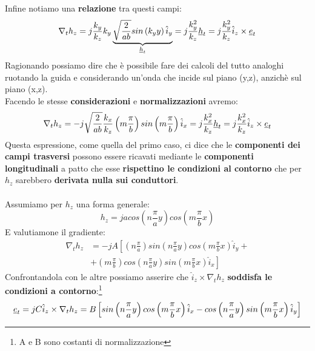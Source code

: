 Infine notiamo una \textbf{relazione} tra questi campi:
\begin{equation*}
    \nabla_t h_z = j \frac{k_y}{k_z} k_y \underbrace{\sqrt{\frac{2}{ab}}  sin\left(k_y y\right) \hat{i}_y}_{\underline{h}_t} = j \frac{k^2_y}{k_z}\underline{h}_t = j  \frac{k^2_y}{k_z} \hat{i}_z \times \underline{e}_t
\end{equation*}
Ragionando possiamo dire che è possibile fare dei calcoli del tutto analoghi ruotando la guida e considerando un'onda che incide sul piano (y,z), anzichè sul piano (x,z).\\ 
Facendo le stesse \textbf{considerazioni} e \textbf{normalizzazioni} avremo:
\begin{equation*}
    \nabla_t h_z = - j \sqrt{\frac{2}{ab}} \frac{k_x}{k_z} \left(m \frac{\pi}{b}\right) sin\left(m \frac{\pi}{b}\right)\hat{i}_x = j  \frac{k^2_x}{k_z} \underline{h}_t = j \frac{k^2_x}{k_z} \hat{i}_z \times \underline{e}_t
\end{equation*}
Questa espressione, come quella del primo caso, ci dice che le \textbf{componenti dei campi trasversi} possono essere ricavati mediante le \textbf{componenti longitudinali} a patto che esse \textbf{rispettino le condizioni al contorno} che per $h_z$ sarebbero \textbf{derivata nulla sui conduttori}.\\ \\
Assumiamo per $h_z$ una forma generale:
\begin{equation*}
    h_z = j acos\left(n \frac{\pi}{a} y\right) cos\left(m \frac{\pi}{b} x\right)
\end{equation*}E valutiamone il gradiente:
\begin{equation*}
\begin{aligned}
    \nabla_t h_z &= -j A \left[\left(n \frac{\pi}{a}\right) sin \left(n \frac{\pi}{a} y\right) cos\left(m \frac{\pi}{b} x\right)\hat{i}_y + \right. \\
    &\left. + \left(m \frac{\pi}{b} \right) cos\left(n \frac{\pi}{a} y\right) sin\left(m \frac{\pi}{b} x\right) \hat{i}_x\right]
\end{aligned}
\end{equation*}
Confrontandola con le altre possiamo asserire che $\hat{i}_z \times \nabla_t h_z$ \textbf{soddisfa le condizioni a contorno}:\footnote{A e B sono costanti di normalizzazione}
\begin{equation*}
    \underline{e}_t = j C \hat{i}_z \times \nabla_t h_z = B \left[sin \left(n \frac{\pi}{a} y\right) cos\left(m \frac{\pi}{b} x\right)\hat{i}_x
    - cos\left(n \frac{\pi}{a} y\right) sin\left(m \frac{\pi}{b} x\right) \hat{i}_y\right]
\end{equation*}
